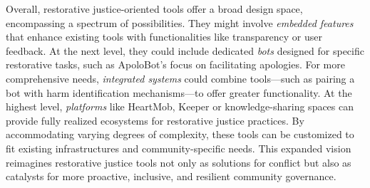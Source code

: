 
Overall, restorative justice-oriented tools offer a broad design space, encompassing a spectrum of possibilities. They might involve \textit{embedded features} that enhance existing tools with functionalities like transparency or user feedback. At the next level, they could include dedicated \textit{bots} designed for specific restorative tasks, such as ApoloBot’s focus on facilitating apologies. For more comprehensive needs, \textit{integrated systems} could combine tools—such as pairing a bot with harm identification mechanisms—to offer greater functionality. At the highest level, \textit{platforms} like HeartMob, Keeper or knowledge-sharing spaces can provide fully realized ecosystems for restorative justice practices. By accommodating varying degrees of complexity, these tools can be customized to fit existing infrastructures and community-specific needs. This expanded vision reimagines restorative justice tools not only as solutions for conflict but also as catalysts for more proactive, inclusive, and resilient community governance.


